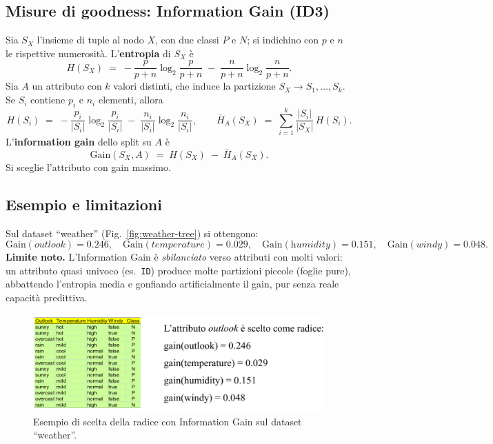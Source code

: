 \subsection{Misure di goodness: Information Gain (ID3)}\label{subsec:ig}
Sia $S_X$ l’insieme di tuple al nodo $X$, con due classi $P$ e $N$; si indichino con $p$
e $n$ le rispettive numerosità. L’\textbf{entropia} di $S_X$ è
\[
H(S_X)\;=\; -\frac{p}{p+n}\log_2\!\frac{p}{p+n}\;-\;\frac{n}{p+n}\log_2\!\frac{n}{p+n}.
\]
Sia $A$ un attributo con $k$ valori distinti, che induce la partizione
$S_X \to S_1,\dots,S_k$. Se $S_i$ contiene $p_i$ e $n_i$ elementi, allora
\[
H(S_i)\;=\; -\frac{p_i}{|S_i|}\log_2\!\frac{p_i}{|S_i|}\;-\;\frac{n_i}{|S_i|}\log_2\!\frac{n_i}{|S_i|},\qquad
\overline{H}_A(S_X)\;=\;\sum_{i=1}^k \frac{|S_i|}{|S_X|}\,H(S_i).
\]
L’\textbf{information gain} dello split su $A$ è
\[
\mathrm{Gain}(S_X,A)\;=\;H(S_X)\;-\;\overline{H}_A(S_X).
\]
Si sceglie l’attributo con gain massimo.

\subsection{Esempio e limitazioni}\label{subsec:ig-example}
Sul dataset “weather” (Fig.~\ref{fig:weather-tree}) si ottengono:
\[
\mathrm{Gain}(\textit{outlook})=0.246,\quad
\mathrm{Gain}(\textit{temperature})=0.029,\quad
\mathrm{Gain}(\textit{humidity})=0.151,\quad
\mathrm{Gain}(\textit{windy})=0.048.
\]
\noindent
\textbf{Limite noto.} L’Information Gain è \emph{sbilanciato} verso attributi con molti valori:
un attributo quasi univoco (es.\ \texttt{ID}) produce molte partizioni piccole (foglie pure),
abbattendo l’entropia media e gonfiando artificialmente il gain, pur senza reale capacità
predittiva.

\begin{figure}[htbp]
  \centering
  \includegraphics[width=.75\textwidth]{images/ig_outlook_example.png}
  \caption{Esempio di scelta della radice con Information Gain sul dataset “weather”.}
  \label{fig:ig-weather}
\end{figure}
